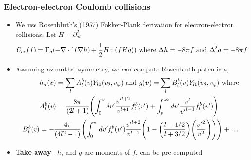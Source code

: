 \documentclass[mathserif, aspectratio=169]{beamer}
\newcommand{\vect}[1]{\boldsymbol{#1}}
\newcommand{\of}[1]{\mleft( #1 \mright)}
\newcommand{\diff}[1]{\, d#1}
\newcommand{\vtheta}{{v_{\theta}}}
\newcommand{\vphi}{v_{\varphi}}
\begin{document}
\begin{frame}
	\frametitle{Electron-electron  Coulomb collisions}
	\begin{itemize}
		\item We use Rosenbluth's (1957) Fokker-Plank derivation for electron-electron collisions. Let $H=\partial^2_{ab}$
		\begin{align}
			C_{ee}(f) &= \Gamma_a(-\nabla \cdot (f \nabla h ) + \frac{1}{2} H : \of{f H g}) \text{ where } \Delta h  = -8\pi f \text{ and } \Delta^2 g =-8\pi f	
		\end{align}
		\item Assuming azimuthal symmetry, we can compute Rosenbluth potentials, 
		\begin{align}
			& h_a\of{\vect{v}} = \sum_{l} A^{b}_l\of{v} Y_{l0}\of{\vtheta, \vphi}  \text{ and } g\of{\vect{v}} = \sum_{l} B^{b}_l\of{v} Y_{l0}\of{\vtheta, \vphi}\text{ where } \\
			\tiny
			& A^{b}_l\of{v} = \frac{8\pi}{(2l+1)}\of{\int_{0}^{v} dv^\prime \frac{{v^\prime}^{l+2}}{v^{l+1}} f^{b}_l\of{v^\prime} +  \int_{v}^{\infty} dv^\prime \frac{{v}^{l}}{{v^\prime}^{l-1}} f^{b}_l\of{v^\prime}}\\
			\tiny
			B^{b}_{l}\of{v} & = -\frac{4\pi}{(4l^2-1)} \of
			{
				\int_{0}^{v} \diff{v^\prime} f^{b}_l\of{v^\prime} \frac{{v^\prime}^{l+2}}{v^{l-1}} \of{1 - \of{\frac{l-1/2}{l+3/2}}\of{\frac{{v^\prime}^2 }{v^2}}} } + \hdots%
		\end{align}
		\item \textbf{Take away} : $h$, and $g$ are moments of $f$, can be pre-computed
	\end{itemize}
\end{frame}
\end{document}
